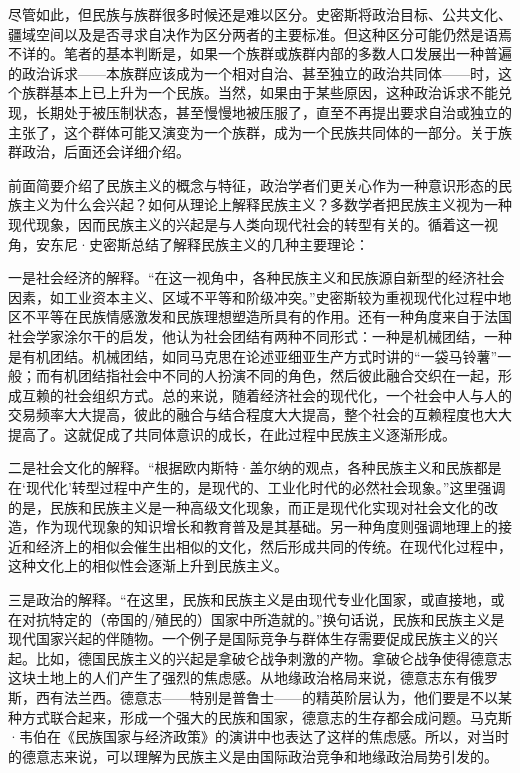 尽管如此，但民族与族群很多时候还是难以区分。史密斯将政治目标、公共文化、疆域空间以及是否寻求自决作为区分两者的主要标准。但这种区分可能仍然是语焉不详的。笔者的基本判断是，如果一个族群或族群内部的多数人口发展出一种普遍的政治诉求——本族群应该成为一个相对自治、甚至独立的政治共同体——时，这个族群基本上已上升为一个民族。当然，如果由于某些原因，这种政治诉求不能兑现，长期处于被压制状态，甚至慢慢地被压服了，直至不再提出要求自治或独立的主张了，这个群体可能又演变为一个族群，成为一个民族共同体的一部分。关于族群政治，后面还会详细介绍。


前面简要介绍了民族主义的概念与特征，政治学者们更关心作为一种意识形态的民族主义为什么会兴起？如何从理论上解释民族主义？多数学者把民族主义视为一种现代现象，因而民族主义的兴起是与人类向现代社会的转型有关的。循着这一视角，安东尼·史密斯总结了解释民族主义的几种主要理论：

一是社会经济的解释。“在这一视角中，各种民族主义和民族源自新型的经济社会因素，如工业资本主义、区域不平等和阶级冲突。”史密斯较为重视现代化过程中地区不平等在民族情感激发和民族理想塑造所具有的作用。还有一种角度来自于法国社会学家涂尔干的启发，他认为社会团结有两种不同形式：一种是机械团结，一种是有机团结。机械团结，如同马克思在论述亚细亚生产方式时讲的“一袋马铃薯”一般；而有机团结指社会中不同的人扮演不同的角色，然后彼此融合交织在一起，形成互赖的社会组织方式。总的来说，随着经济社会的现代化，一个社会中人与人的交易频率大大提高，彼此的融合与结合程度大大提高，整个社会的互赖程度也大大提高了。这就促成了共同体意识的成长，在此过程中民族主义逐渐形成。

二是社会文化的解释。“根据欧内斯特·盖尔纳的观点，各种民族主义和民族都是在‘现代化’转型过程中产生的，是现代的、工业化时代的必然社会现象。”这里强调的是，民族和民族主义是一种高级文化现象，而正是现代化实现对社会文化的改造，作为现代现象的知识增长和教育普及是其基础。另一种角度则强调地理上的接近和经济上的相似会催生出相似的文化，然后形成共同的传统。在现代化过程中，这种文化上的相似性会逐渐上升到民族主义。

三是政治的解释。“在这里，民族和民族主义是由现代专业化国家，或直接地，或在对抗特定的（帝国的/殖民的）国家中所造就的。”换句话说，民族和民族主义是现代国家兴起的伴随物。一个例子是国际竞争与群体生存需要促成民族主义的兴起。比如，德国民族主义的兴起是拿破仑战争刺激的产物。拿破仑战争使得德意志这块土地上的人们产生了强烈的焦虑感。从地缘政治格局来说，德意志东有俄罗斯，西有法兰西。德意志——特别是普鲁士——的精英阶层认为，他们要是不以某种方式联合起来，形成一个强大的民族和国家，德意志的生存都会成问题。马克斯·韦伯在《民族国家与经济政策》的演讲中也表达了这样的焦虑感。所以，对当时的德意志来说，可以理解为民族主义是由国际政治竞争和地缘政治局势引发的。

